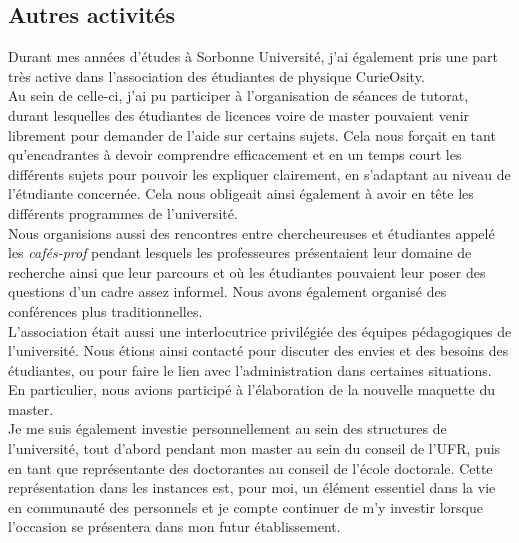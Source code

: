 \documentclass[a4paper,11pt]{article} %
\newcommand{\pointmedian}{{\fontfamily{cmr}\selectfont\textperiodcentered}}
\begin{document}
	\subsection{Autres activités}
	Durant mes années d'études à Sorbonne Université, j'ai également pris une part très active dans l'association des étudiant\pointmedian es de physique CurieOsity.\\ 
	Au sein de celle-ci, j'ai pu participer à l'organisation de séances de tutorat, durant lesquelles des étudiant\pointmedian es de licences voire de master pouvaient venir librement pour demander de l'aide sur certains sujets. Cela nous forçait en tant qu'encadrant\pointmedian es à devoir comprendre efficacement et en un temps court les différents sujets pour pouvoir les expliquer clairement, en s'adaptant au niveau de l'étudiant\pointmedian e concerné\pointmedian e. Cela nous obligeait ainsi également à avoir en tête les différents programmes de l'université.\\
	Nous organisions aussi des rencontres entre chercheur\pointmedian euses et étudiant\pointmedian es appelé les \textit{cafés-prof} pendant lesquels les professeur\pointmedian es présentaient leur domaine de recherche ainsi que leur parcours et où les étudiant\pointmedian{}es pouvaient leur poser des questions d'un cadre assez informel. Nous avons également organisé des conférences plus traditionnelles.\\
	L'association était aussi une interlocutrice privilégiée des équipes pédagogiques de l'université. Nous étions ainsi contacté pour discuter des envies et des besoins des étudiant\pointmedian es, ou pour faire le lien avec l'administration dans certaines situations. En particulier, nous avions participé à l'élaboration de la nouvelle maquette du master.\\
	
	Je me suis également investie personnellement au sein des structures de l'université, tout d'abord pendant mon master au sein du conseil de l'UFR, puis en tant que représentante des doctorant\pointmedian es au conseil de l'école doctorale. Cette représentation dans les instances est, pour moi, un élément essentiel dans la vie en communauté des personnels et je compte continuer de m'y investir lorsque l'occasion se présentera dans mon futur établissement.
	
	
\end{document}
